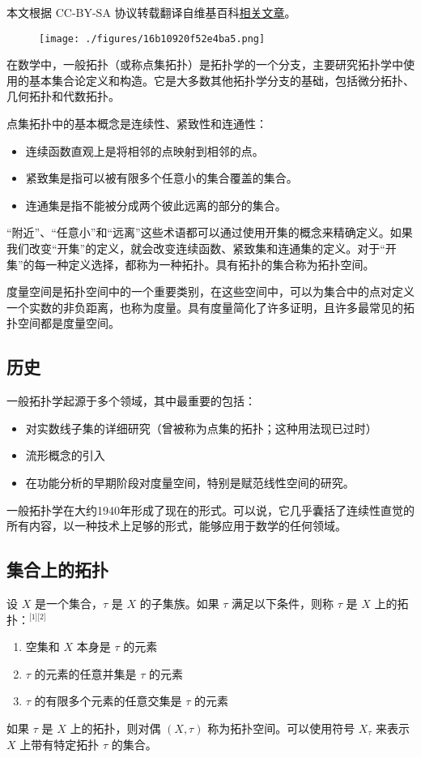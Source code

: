 
本文根据 CC-BY-SA 协议转载翻译自维基百科\href{https://en.wikipedia.org/wiki/General_topology}{相关文章}。

\begin{figure}[ht]
\centering
\texttt{[image: ./figures/16b10920f52e4ba5.png]}
\caption{} \label{fig_DJTP_1}
\end{figure}
在数学中，一般拓扑（或称点集拓扑）是拓扑学的一个分支，主要研究拓扑学中使用的基本集合论定义和构造。它是大多数其他拓扑学分支的基础，包括微分拓扑、几何拓扑和代数拓扑。

点集拓扑中的基本概念是连续性、紧致性和连通性：
\begin{itemize}
\item 连续函数直观上是将相邻的点映射到相邻的点。
\item 紧致集是指可以被有限多个任意小的集合覆盖的集合。
\item 连通集是指不能被分成两个彼此远离的部分的集合。
\end{itemize}
“附近”、“任意小”和“远离”这些术语都可以通过使用开集的概念来精确定义。如果我们改变“开集”的定义，就会改变连续函数、紧致集和连通集的定义。对于“开集”的每一种定义选择，都称为一种拓扑。具有拓扑的集合称为拓扑空间。

度量空间是拓扑空间中的一个重要类别，在这些空间中，可以为集合中的点对定义一个实数的非负距离，也称为度量。具有度量简化了许多证明，且许多最常见的拓扑空间都是度量空间。
\subsection{历史}
一般拓扑学起源于多个领域，其中最重要的包括：
\begin{itemize}
\item 对实数线子集的详细研究（曾被称为点集的拓扑；这种用法现已过时）
\item 流形概念的引入
\item 在功能分析的早期阶段对度量空间，特别是赋范线性空间的研究。
\end{itemize}
一般拓扑学在大约1940年形成了现在的形式。可以说，它几乎囊括了连续性直觉的所有内容，以一种技术上足够的形式，能够应用于数学的任何领域。
\subsection{集合上的拓扑}
设 $X$ 是一个集合，$\tau$ 是 $X$ 的子集族。如果 $\tau$ 满足以下条件，则称 $\tau$ 是 $X$ 上的拓扑：\(^\text{[1][2]}\)
\begin{enumerate}
\item 空集和 $X$ 本身是 $\tau$ 的元素
\item $\tau$ 的元素的任意并集是 $\tau$ 的元素
\item $\tau$ 的有限多个元素的任意交集是 $\tau$ 的元素
\end{enumerate}
如果 $\tau$ 是 $X$ 上的拓扑，则对偶 $(X, \tau)$ 称为拓扑空间。可以使用符号 $X_\tau$ 来表示 $X$ 上带有特定拓扑 $\tau$ 的集合。

